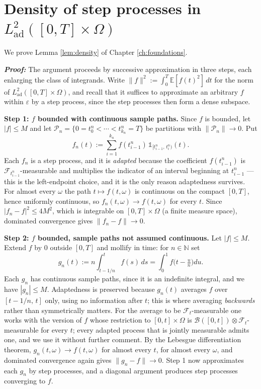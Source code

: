 \section{Density of step processes in \texorpdfstring{$L^2_{\mathrm{ad}}([0,T]\times\Omega)$}{L2ad([0,T] x Omega)}}\label{app:proof:density}
We prove Lemma \ref{lem:density} of Chapter \ref{ch:foundations}.

\textbf{\textit{Proof:}} The argument proceeds by successive approximation in three steps, each
enlarging the class of integrands. Write $\lVert f\rVert^2 := \int_0^T\mathbb{E}[f(t)^2]\,dt$ for the
norm of $L^2_{\mathrm{ad}}([0,T]\times\Omega)$, and recall that it suffices to approximate an arbitrary
$f$ within $\varepsilon$ by a step process, since the step processes then form a dense subspace.

\medskip
\noindent\textbf{Step 1: $f$ bounded with continuous sample paths.} Since $f$ is bounded, let $|f| \leq M$ and let
$\mathcal{P}_n = \{0 = t^n_0 < \cdots < t^n_{k_n} = T\}$ be partitions with
$\lVert\mathcal{P}_n\rVert \to 0$. Put
\[
f_n(t) := \sum_{i=1}^{k_n} f(t^n_{i-1})\,\mathds{1}_{[t^n_{i-1},\,t^n_i)}(t).
\]
Each $f_n$ is a step process, and it is \emph{adapted} because the coefficient $f(t^n_{i-1})$ is
$\mathcal{F}_{t^n_{i-1}}$-measurable and multiplies the indicator of an interval beginning at
$t^n_{i-1}$ --- this is the left-endpoint choice, and it is the only reason adaptedness survives. For
almost every $\omega$ the path $t \mapsto f(t,\omega)$ is continuous on the compact $[0,T]$, hence
uniformly continuous, so $f_n(t,\omega) \to f(t,\omega)$ for every $t$. Since
$|f_n - f|^2 \leq 4M^2$, which is integrable on $[0,T]\times\Omega$ (a finite measure space),
dominated convergence gives $\lVert f_n - f\rVert \to 0$.

\medskip
\noindent\textbf{Step 2: $f$ bounded, sample paths not assumed continuous.} Let $|f| \leq M$. Extend
$f$ by $0$ outside $[0,T]$ and mollify in time: for $n \in \mathbb{N}$ set
\[
g_n(t) := n\int_{t - 1/n}^{t} f(s)\,ds = \int_0^1 f\bigl(t - \tfrac{u}{n}\bigr)du .
\]
Each $g_n$ has continuous sample paths, since it is an indefinite integral, and we have $|g_n| \leq M$.
Adaptedness is preserved because $g_n(t)$ averages $f$ over $[t-1/n,\,t]$ only, using no information
after $t$; this is where averaging \emph{backwards} rather than symmetrically matters. For the
average to be $\mathcal{F}_t$-measurable one works  with the version of $f$ whose
restriction to $[0,t]\times\Omega$ is $\mathcal{B}([0,t])\otimes\mathcal{F}_t$-measurable for every
$t$; every adapted process that is jointly measurable admits one, and we use it without further
comment. By the
Lebesgue differentiation theorem, $g_n(t,\omega) \to f(t,\omega)$ for almost every $t$, for almost
every $\omega$, and dominated convergence again gives $\lVert g_n - f\rVert \to 0$. Step 1 now
approximates each $g_n$ by step processes, and a diagonal argument produces step processes converging
to $f$.

